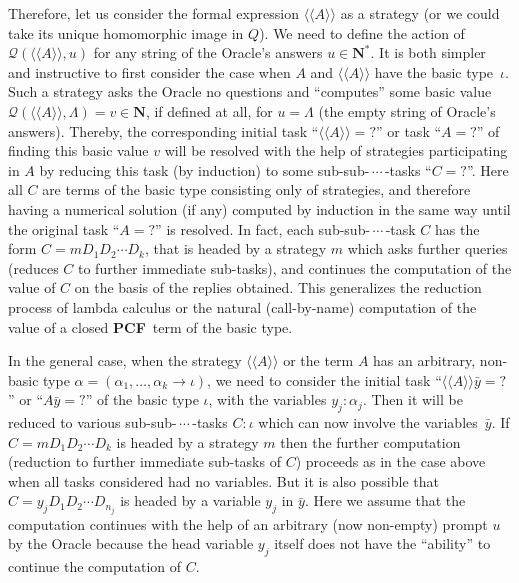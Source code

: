\documentclass[fleqn]{LMCS}
\theoremstyle{plain}\newtheorem{satz}[thm]{Satz}
\theoremstyle{plain}\newtheorem{hyp}[thm]{Hypothesis}
\theoremstyle{plain}\newtheorem{hyps}[thm]{Hypotheses}
\theoremstyle{definition}\newtheorem{note}[thm]{Note}
\newcommand{\arr}{\rightarrow}
\newcommand{\lla}{\langle\!\langle}
\newcommand{\rra}{\rangle\!\rangle}
\newcommand{\Osem}[1]{\lla #1 \rra}
\newcommand{\NN}{\mathbf{N}}
\newcommand{\Basictype}{\iota}
\newcommand{\PCF}{\mbox{\bf PCF}}
\newcommand{\QQ}{{\mathcal Q}}
\newcommand{\?}{\mbox{?}}
\begin{document}
Therefore, let us consider the formal expression $\Osem{A}$ as a strategy 
(or we could take its unique homomorphic image in $Q$). 
We need to define the action of $\QQ(\Osem{A},u)$ 
for any string of the Oracle's answers $u\in\NN^*$. 
It is both simpler and instructive to first consider the case when $A$ and $\Osem{A}$ 
have the basic type~$\iota$. Such a strategy asks the Oracle no questions  
and ``computes'' some basic value $\QQ(\Osem{A},\Lambda)=v\in\NN$, 
if defined at all, for $u=\Lambda$ (the empty string of Oracle's answers). 
Thereby, the corresponding initial task ``$\Osem{A}={?}$'' or task 
``$A={?}$'' of finding this basic value $v$ will be resolved 
with the help of strategies participating in $A$ by reducing this task 
(by induction) to some sub-sub-$\,\cdots\,$-tasks ``$C={?}$''. 
Here all $C$ are terms of the basic type consisting only of strategies, and therefore 
having a numerical solution (if any) computed by induction in the same way 
until the original task ``$A={?}$'' is resolved.
In fact, each  sub-sub-$\,\cdots\,$-task $C$ has the form 
$C=mD_1 D_2\cdots D_k$, that is headed by a strategy $m$ 
which asks further queries (reduces $C$ to further immediate sub-tasks),
and continues the computation of the value of $C$ on the basis of the replies obtained. 
This generalizes the 
reduction process of lambda calculus or the natural (call-by-name) computation 
of the value of a closed \PCF\ term of the basic type. 


















In the general case, when the strategy $\Osem{A}$ or the term $A$ has 
an arbitrary, non-basic type 
$\alpha=(\alpha_1,\ldots,\alpha_k\arr\Basictype)$,
we need to consider the initial task ``$\Osem{A}\bar{y}={?}$'' 
or ``$A\bar{y}={?}$'' 
of the basic type $\iota$, with the variables $y_j:\alpha_j$. 
Then
it will be reduced to various sub-sub-$\,\cdots\,$-tasks 
$C:\iota$ 
which can now involve the variables~$\bar{y}$. If $C=mD_1 D_2\cdots D_k$ 
is headed by a strategy 
$m$ then the further computation (reduction to further immediate sub-tasks of $C$) 
proceeds as in the case above when all tasks considered had no variables. 
But it is also possible that 
$C=y_j D_1 D_2\cdots D_{n_j}$ is headed by a variable $y_j$ in $\bar{y}$. 
Here we assume that the computation continues with 
the help of an arbitrary (now non-empty) prompt $u$ by the Oracle 
because the head variable $y_j$ itself 
does not have the ``ability'' to continue the computation of $C$. 
\end{document}
